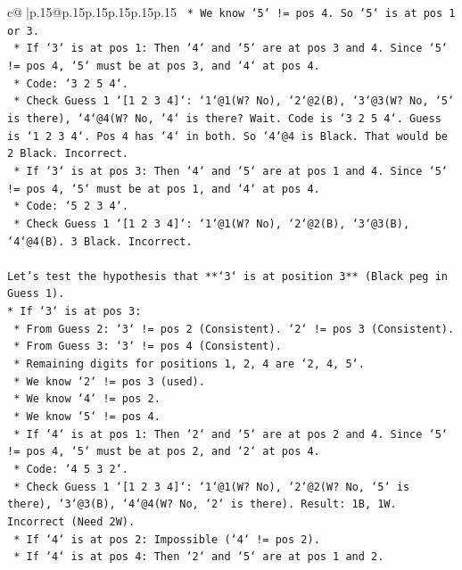 \documentclass{article}
\begin{document}
{\begin{supertabular}{c@{$\;$}|p{.15\linewidth}@{}p{.15\linewidth}p{.15\linewidth}p{.15\linewidth}p{.15\linewidth}p{.15\linewidth}}
{{{\texttt{    *   We know `5` != pos 4. So `5` is at pos 1 or 3.} \\
\texttt{    *   If `3` is at pos 1: Then `4` and `5` are at pos 3 and 4. Since `5` != pos 4, `5` must be at pos 3, and `4` at pos 4.} \\
\texttt{        *   Code: `3 2 5 4`.} \\
\texttt{        *   Check Guess 1 `{[}1 2 3 4{]}`: `1`@1(W? No), `2`@2(B), `3`@3(W? No, `5` is there), `4`@4(W? No, `4` is there? Wait. Code is `3 2 5 4`. Guess is `1 2 3 4`. Pos 4 has `4` in both. So `4`@4 is Black. That would be 2 Black. Incorrect.} \\
\texttt{    *   If `3` is at pos 3: Then `4` and `5` are at pos 1 and 4. Since `5` != pos 4, `5` must be at pos 1, and `4` at pos 4.} \\
\texttt{        *   Code: `5 2 3 4`.} \\
\texttt{        *   Check Guess 1 `{[}1 2 3 4{]}`: `1`@1(W? No), `2`@2(B), `3`@3(B), `4`@4(B). 3 Black. Incorrect.} \\
\\ 
\texttt{Let's test the hypothesis that **`3` is at position 3** (Black peg in Guess 1).} \\
\texttt{*   If `3` is at pos 3:} \\
\texttt{    *   From Guess 2: `3` != pos 2 (Consistent). `2` != pos 3 (Consistent).} \\
\texttt{    *   From Guess 3: `3` != pos 4 (Consistent).} \\
\texttt{    *   Remaining digits for positions 1, 2, 4 are `2, 4, 5`.} \\
\texttt{    *   We know `2` != pos 3 (used).} \\
\texttt{    *   We know `4` != pos 2.} \\
\texttt{    *   We know `5` != pos 4.} \\
\texttt{    *   If `4` is at pos 1: Then `2` and `5` are at pos 2 and 4. Since `5` != pos 4, `5` must be at pos 2, and `2` at pos 4.} \\
\texttt{        *   Code: `4 5 3 2`.} \\
\texttt{        *   Check Guess 1 `{[}1 2 3 4{]}`: `1`@1(W? No), `2`@2(W? No, `5` is there), `3`@3(B), `4`@4(W? No, `2` is there). Result: 1B, 1W. Incorrect (Need 2W).} \\
\texttt{    *   If `4` is at pos 2: Impossible (`4` != pos 2).} \\
\texttt{    *   If `4` is at pos 4: Then `2` and `5` are at pos 1 and 2.} \\
}}}
\end{supertabular}}
\end{document}
